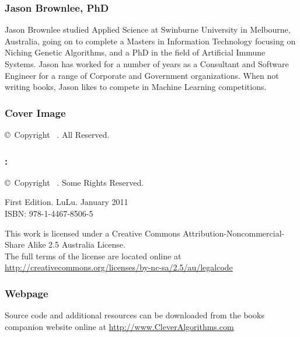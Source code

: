 

\vspace*{\fill}
\begin{flushleft}
\begin{small}

\subsubsection*{Jason Brownlee, PhD}
Jason Brownlee studied Applied Science at Swinburne University in Melbourne, Australia, going on to complete a Masters in Information Technology focusing on Niching Genetic Algorithms, and a PhD in the field of Artificial Immune Systems. Jason has worked for a number of years as a Consultant and Software Engineer for a range of Corporate and Government organizations. When not writing books, Jason likes to compete in Machine Learning competitions.

\subsubsection*{Cover Image}
\copyright\ Copyright \mybookdate\ \mybookauthor. All Reserved. \\
\vspace{0.5cm}

\subsubsection*{\mybooktitle: \mybooksubtitle}
\copyright\ Copyright \mybookdate\ \mybookauthor. Some Rights Reserved. \\
\vspace{0.5cm}

First Edition. LuLu. January 2011 \\
ISBN: 978-1-4467-8506-5 \\
\vspace{0.5cm}

This work is licensed under a Creative Commons Attribution\--Noncommercial\--Share Alike 2.5 Australia License. \\
The full terms of the license are located online at \url{http://creativecommons.org/licenses/by-nc-sa/2.5/au/legalcode} \\
\vspace{0.5cm}

\subsubsection*{Webpage}
Source code and additional resources can be downloaded from the books companion website online at \url{http://www.CleverAlgorithms.com}

\end{small}
\end{flushleft}

